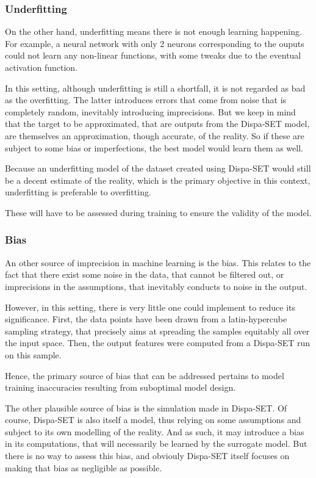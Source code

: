 \subsubsection{Underfitting}

On the other hand, underfitting means there is not enough learning happening. For example, a neural network with only 2 neurons corresponding to the ouputs could not learn any non-linear functions, with some tweaks due to the eventual activation function.

In this setting, although underfitting is still a shortfall, it is not regarded as bad as the overfitting. The latter introduces errors that come from noise that is completely random, inevitably introducing imprecisions. But we keep in mind that the target to be approximated, that are outputs from the Dispa-SET model, are themselves an approximation, though accurate, of the reality. So if these are subject to some bias or imperfections, the best model would learn them as well.

Because an underfitting model of the dataset created using Dispa-SET would still be a decent estimate of the reality, which is the primary objective in this context, underfitting is preferable to overfitting.

These will have to be assessed during training to ensure the validity of the model.

\subsubsection{Bias\label{ssec:bias}}

An other source of imprecision in machine learning is the bias. This relates to the fact that there exist some noise in the data, that cannot be filtered out, or imprecisions in the assumptions, that inevitably conducts to noise in the output.

However, in this setting, there is very little one could implement to reduce its significance. First, the data points have been drawn from a latin-hypercube sampling strategy, that precisely aims at spreading the samples equitably all over the input space. Then, the output features were computed from a Dispa-SET run on this sample.

Hence, the primary source of bias that can be addressed pertains to model training inaccuracies resulting from suboptimal model design.

The other plausible source of bias is the simulation made in Dispa-SET. Of course, Dispa-SET is also itself a model, thus relying on some assumptions and subject to its own modelling of the reality. And as such, it may introduce a bias in its computations, that will necessarily be learned by the surrogate model. But there is no way to assess this bias, and obviouly Dispa-SET itself focuses on making that bias as negligible as possible.


